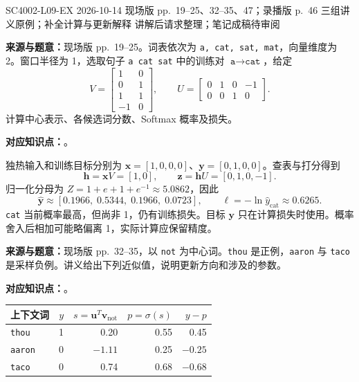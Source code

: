 
\examplemeta
  {SC4002-L09-EX}
  {2026-10-14}
  {现场版 pp.~19--25、32--35、47；录播版 p.~46}
  {三组讲义原例；补全计算与更新解释}
  {讲解后请求整理；笔记成稿待审阅}


\textbf{来源与题意：}现场版 pp.~19--25。词表依次为 \texttt{a, cat, sat, mat}，向量维度为 2。窗口半径为 1，选取句子 \texttt{a cat sat} 中的训练对 $\texttt{a}\to\texttt{cat}$，给定
\[
 V=\begin{bmatrix}1&0\\0&1\\1&1\\-1&0\end{bmatrix},
 \qquad
 U=\begin{bmatrix}0&1&0&-1\\0&0&1&0\end{bmatrix}.
\]
计算中心表示、各候选词分数、Softmax 概率及损失。

\textbf{对应知识点：}。

\begin{workedsolution}
独热输入和训练目标分别为 $\mathbf x=[1,0,0,0]$、$\mathbf y=[0,1,0,0]$。查表与打分得到
\[
 \mathbf h=\mathbf xV=[1,0],\qquad
 \mathbf z=\mathbf hU=[0,1,0,-1].
\]
归一化分母为 $Z=1+e+1+e^{-1}\approx5.0862$，因此
\[
 \hat{\mathbf y}\approx[0.1966,\;0.5344,\;0.1966,\;0.0723],
 \qquad
 \ell=-\ln\hat y_{\mathrm{cat}}\approx0.6265.
\]
\texttt{cat} 当前概率最高，但尚非 1，仍有训练损失。目标 $\mathbf y$ 只在计算损失时使用。概率舍入后相加可能略偏离 1，实际计算应保留精度。
\end{workedsolution}


\textbf{来源与题意：}现场版 pp.~32--35，以 \texttt{not} 为中心词。\texttt{thou} 是正例，\texttt{aaron} 与 \texttt{taco} 是采样负例。讲义给出下列近似值，说明更新方向和涉及的参数。

\textbf{对应知识点：}。

\begin{center}
\begin{tabular}{@{}lrrrr@{}}
\toprule
上下文词 & $y$ & $s=\mathbf u^T\mathbf v_{\mathrm{not}}$ & $p=\sigma(s)$ & $y-p$ \\
\midrule
\texttt{thou} & 1 & 0.20 & 0.55 & 0.45 \\
\texttt{aaron} & 0 & $-1.11$ & 0.25 & $-0.25$ \\
\texttt{taco} & 0 & 0.74 & 0.68 & $-0.68$ \\
\bottomrule
\end{tabular}
\end{center}

